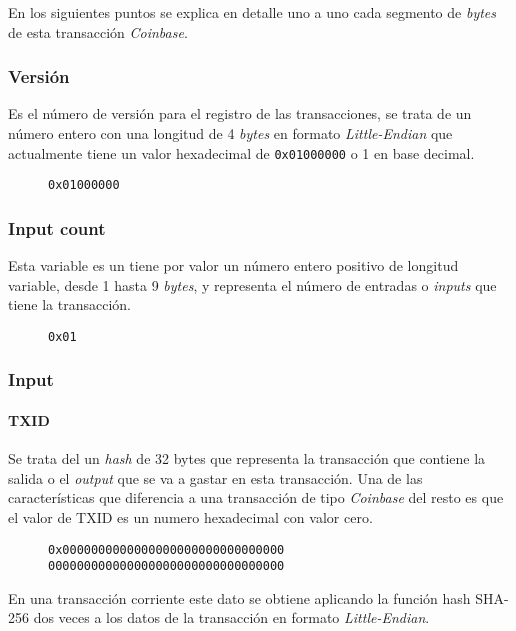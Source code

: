 \documentclass{article}
\begin{document}
    En los siguientes puntos se explica en detalle uno a uno cada segmento de \textit{bytes} de esta transacción \textit{Coinbase}.
    
    \subsubsection{Versión}
    Es el número de versión para el registro de las transacciones, se trata de un número entero con una longitud de 4 \textit{bytes} en formato \textit{Little-Endian} que actualmente tiene un valor hexadecimal de \texttt{0x01000000} o 1 en base decimal.
    \begin{figure}[H]
        \texttt{0x01000000}
    \end{figure}
    
    \subsubsection{Input count}
    Esta variable es un tiene por valor un número entero positivo de longitud variable, desde 1 hasta 9 \textit{bytes}, y representa el número de entradas o \textit{inputs} que tiene la transacción.
    \begin{figure}[H]
        \texttt{0x01}
    \end{figure}
    
    \subsubsection{Input}
    
    \paragraph{TXID}
    Se trata del un \textit{hash} de 32 bytes que representa la transacción que contiene la salida o el \textit{output} que se va a gastar en esta transacción. Una de las características que diferencia a una transacción de tipo \textit{Coinbase} del resto es que el valor de TXID es un numero hexadecimal con valor cero.
    \begin{figure}[H]
        \texttt{0x0000000000000000000000000000000} \\
        \texttt{000000000000000000000000000000000}
    \end{figure}
    En una transacción corriente este dato se obtiene aplicando la función hash SHA-256 dos veces a los datos de la transacción en formato \textit{Little-Endian}.
    
\end{document}
